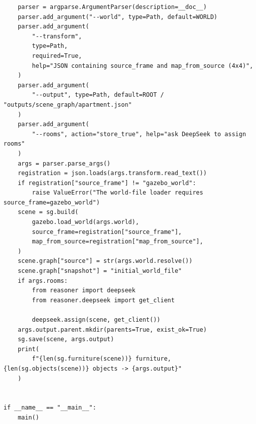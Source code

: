 \documentclass[11pt,a4paper]{book}
\begin{document}
\begin{lstlisting}
    parser = argparse.ArgumentParser(description=__doc__)
    parser.add_argument("--world", type=Path, default=WORLD)
    parser.add_argument(
        "--transform",
        type=Path,
        required=True,
        help="JSON containing source_frame and map_from_source (4x4)",
    )
    parser.add_argument(
        "--output", type=Path, default=ROOT / "outputs/scene_graph/apartment.json"
    )
    parser.add_argument(
        "--rooms", action="store_true", help="ask DeepSeek to assign rooms"
    )
    args = parser.parse_args()
    registration = json.loads(args.transform.read_text())
    if registration["source_frame"] != "gazebo_world":
        raise ValueError("The world-file loader requires source_frame=gazebo_world")
    scene = sg.build(
        gazebo.load_world(args.world),
        source_frame=registration["source_frame"],
        map_from_source=registration["map_from_source"],
    )
    scene.graph["source"] = str(args.world.resolve())
    scene.graph["snapshot"] = "initial_world_file"
    if args.rooms:
        from reasoner import deepseek
        from reasoner.deepseek import get_client

        deepseek.assign(scene, get_client())
    args.output.parent.mkdir(parents=True, exist_ok=True)
    sg.save(scene, args.output)
    print(
        f"{len(sg.furniture(scene))} furniture, {len(sg.objects(scene))} objects -> {args.output}"
    )


if __name__ == "__main__":
    main()
\end{lstlisting}
\end{document}

